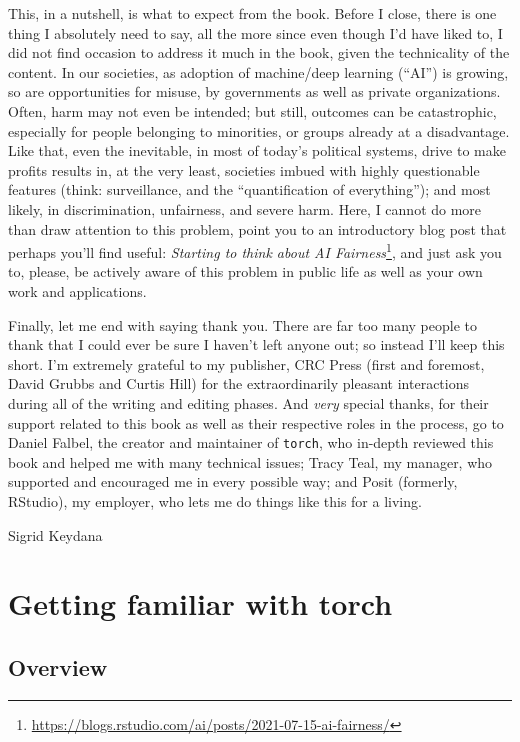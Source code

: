 \documentclass[
  letterpaper,
]{krantz}
\DeclareRobustCommand{\href}[2]{#2\footnote{\url{#1}}}
\begin{document}
This, in a nutshell, is what to expect from the book. Before I close,
there is one thing I absolutely need to say, all the more since even
though I'd have liked to, I did not find occasion to address it much in
the book, given the technicality of the content. In our societies, as
adoption of machine/deep learning (``AI'') is growing, so are
opportunities for misuse, by governments as well as private
organizations. Often, harm may not even be intended; but still, outcomes
can be catastrophic, especially for people belonging to minorities, or
groups already at a disadvantage. Like that, even the inevitable, in
most of today's political systems, drive to make profits results in, at
the very least, societies imbued with highly questionable features
(think: surveillance, and the ``quantification of everything''); and
most likely, in discrimination, unfairness, and severe harm. Here, I
cannot do more than draw attention to this problem, point you to an
introductory blog post that perhaps you'll find useful:
\href{https://blogs.rstudio.com/ai/posts/2021-07-15-ai-fairness/}{\emph{Starting
to think about AI Fairness}}, and just ask you to, please, be actively
aware of this problem in public life as well as your own work and
applications.

Finally, let me end with saying thank you. There are far too many people
to thank that I could ever be sure I haven't left anyone out; so instead
I'll keep this short. I'm extremely grateful to my publisher, CRC Press
(first and foremost, David Grubbs and Curtis Hill) for the
extraordinarily pleasant interactions during all of the writing and
editing phases. And \emph{very} special thanks, for their support
related to this book as well as their respective roles in the process,
go to Daniel Falbel, the creator and maintainer of \texttt{torch}, who
in-depth reviewed this book and helped me with many technical issues;
Tracy Teal, my manager, who supported and encouraged me in every
possible way; and Posit (formerly, RStudio), my employer, who lets me do
things like this for a living.

Sigrid Keydana

\part{Getting familiar with torch}

\hypertarget{sec:basics-overview}{%
\chapter{Overview}\label{sec:basics-overview}}
\end{document}
